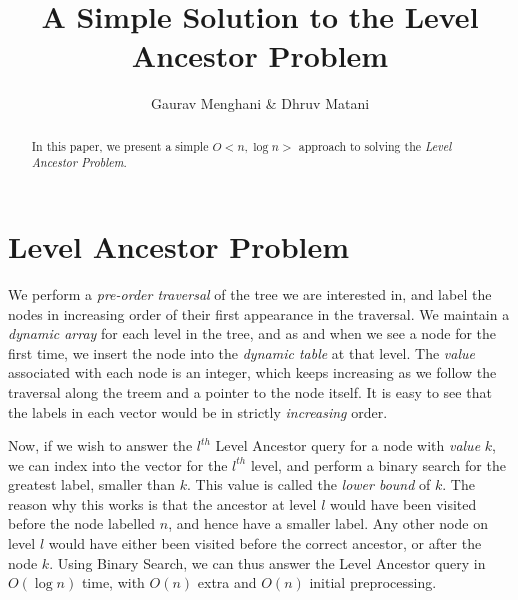 \documentclass{article}
\title{A Simple Solution to the Level Ancestor Problem}
\author{Gaurav Menghani \& Dhruv Matani}
\begin{document}
\maketitle


\begin{abstract}

In this paper, we present a simple $O\mathrm{<}n, \log{n}\mathrm{>}$
approach to solving the \textit{Level Ancestor Problem}.

\end{abstract}


\section{Level Ancestor Problem}
We perform a \textit{pre-order traversal} of the tree we are
interested in, and label the nodes in increasing order of their first
appearance in the traversal. We maintain a \textit{dynamic array} for
each level in the tree, and as and when we see a node for the first
time, we insert the node into the \textit{dynamic table} at that
level. The \textit{value} associated with each node is an integer,
which keeps increasing as we follow the traversal along the treem and
a pointer to the node itself. It is easy to see that the labels in
each vector would be in strictly \textit{increasing} order.

Now, if we wish to answer the $l^{th}$ Level Ancestor query for a node
with \textit{value} $k$, we can index into the vector for the $l^{th}$
level, and perform a binary search for the greatest label, smaller
than $k$. This value is called the \textit{lower bound} of $k$. The
reason why this works is that the ancestor at level $l$ would have
been visited before the node labelled $n$, and hence have a smaller
label. Any other node on level $l$ would have either been visited
before the correct ancestor, or after the node $k$. Using Binary
Search, we can thus answer the Level Ancestor query in $O(\log{n})$
time, with $O(n)$ extra and $O(n)$ initial preprocessing.
\end{document}
